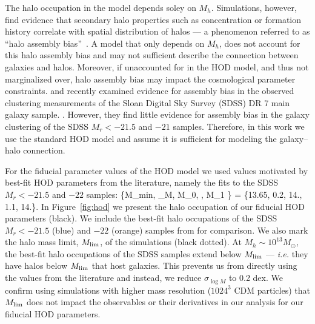 The halo occupation in the \cite{zheng2007} model depends soley on $M_h$. 
Simulations, however, find evidence that secondary halo properties such as
concentration or formation history correlate with spatial distribution of
halos --- a phenomenon referred to as ``halo assembly bias''~\citep{sheth2004, gao2005, harker2006, wechsler2006}.
A model that only depends on $M_h$, does not account for this halo assembly 
bias and may not sufficient describe the connection between galaxies and 
halos. Moreover, if unaccounted for in the HOD model, and thus not marginalized 
over, halo assembly bias may impact the cosmological parameter constraints. 
\cite{zentner2016} and \cite{vakili2019} recently examined evidence for 
assembly bias in the observed clustering measurements of the Sloan Digital 
Sky Survey (SDSS) DR 7 main galaxy sample. 
. 
However, they find little evidence for assembly bias in the galaxy clustering
of the SDSS $M_r < -21.5$  and $-21$ samples. Therefore, in this work we use 
the standard \cite{zheng2007} HOD model and assume it is sufficient for modeling 
the galaxy--halo connection. 

For the fiducial parameter values of the HOD model we used values motivated by 
best-fit HOD parameters from the literature, namely the \cite{zheng2007} 
fits to the SDSS $M_r < -21.5$  and $-22$ samples: 
\beq \label{eq:hod_fid}
\{M_{\rm min}, \sigma_{\log M}, \log M_0, \alpha, \log M_1 \} = \{13.65, 0.2, 14., 1.1, 14.\}.
\eeq
In Figure~\ref{fig:hod} we present the halo occupation of our fiducial 
HOD parameters (black). We include the best-fit halo occupations of 
the SDSS $M_r < -21.5$ (blue)  and $-22$ (orange) samples from \cite{zheng2007}
for comparison. We also mark the halo mass limit, $M_{\rm lim}$, of the \quij 
simulations (black dotted). At $M_h \sim 10^{13} M_\odot$, the best-fit halo 
occupations of the SDSS samples extend below $M_{\rm lim}$ --- \emph{i.e.} 
they have halos below $M_{\rm lim}$ that host galaxies. This prevents us from 
directly using the values from the literature and instead, we reduce 
$\sigma_{\log M}$ to 0.2 dex. We confirm using \quij simulations with higher 
mass resolution ($1024^3$ CDM particles) that $M_{\rm lim}$ does not impact
the observables or their derivatives in our analysis for our fiducial HOD 
parameters. 


